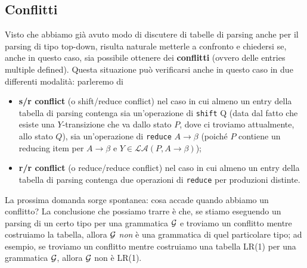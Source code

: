 \documentclass[class=book, crop=false, oneside, 12pt]{standalone}
\begin{document}
\subsection{Conflitti}
Visto che abbiamo già avuto modo di discutere di tabelle di parsing anche per il parsing di tipo top-down, risulta naturale metterle a confronto e chiedersi se, anche in questo caso, sia possibile ottenere dei \textbf{conflitti} (ovvero delle entries multiple defined). Questa situazione può verificarsi anche in questo caso in due differenti modalità: parleremo di
\begin{itemize}
    \item \textbf{s/r conflict} (o shift/reduce conflict) nel caso in cui almeno un entry della tabella di parsing contenga sia un'operazione di \texttt{shift} Q (data dal fatto che esiste una \(Y\)-transizione che va dallo stato \(P\), dove ci troviamo attualmente, allo stato \(Q\)), sia un'operazione di \texttt{reduce} \(A \rightarrow \beta\) (poiché \(P\) contiene un reducing item per \(A \rightarrow \beta\) e \(Y \in \mathcal{LA}(P, A \rightarrow \beta)\));
    \item \textbf{r/r conflict} (o reduce/reduce conflict) nel caso in cui almeno un entry della tabella di parsing contenga due operazioni di \texttt{reduce} per produzioni distinte.
\end{itemize}
La prossima domanda sorge spontanea: cosa accade quando abbiamo un conflitto? La conclusione che possiamo trarre è che, se stiamo eseguendo un parsing di un certo tipo per una grammatica \(\mathcal{G}\) e troviamo un conflitto mentre costruiamo la tabella, allora \(\mathcal{G}\) \emph{non} è una grammatica di quel particolare tipo; ad esempio, se troviamo un conflitto mentre costruiamo una tabella LR(1) per una grammatica \(\mathcal{G}\), allora \(\mathcal{G}\) non è LR(1).
\end{document}
